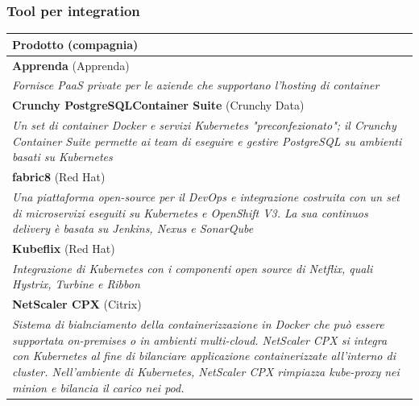 \documentclass[12pt, a4paper]{report}
\begin{document}
\subsubsection{Tool per integration}
\begin{table}[ht]
\small
\centering
\begin{tabularx}{\textwidth}{|l|}
\hline
\textbf{Prodotto} (compagnia) \\
\hline
\textbf{Apprenda} (Apprenda)\\
\multicolumn{1}{|X|}{\textit{Fornisce PaaS private per le aziende che supportano l'hosting di container}}\\
\hline
\textbf{Crunchy PostgreSQLContainer Suite} (Crunchy Data)\\
\multicolumn{1}{|X|}{\textit{Un set di container Docker e servizi Kubernetes "preconfezionato"; il Crunchy Container Suite permette ai team di eseguire e gestire PostgreSQL su ambienti basati su Kubernetes}}\\
\hline
\textbf{fabric8} (Red Hat)\\
\multicolumn{1}{|X|}{\textit{Una piattaforma open-source per il DevOps e integrazione costruita con un set di microservizi eseguiti su Kubernetes e OpenShift V3. La sua continuos delivery è basata su Jenkins, Nexus e SonarQube}}\\
\hline
\textbf{Kubeflix} (Red Hat)\\
\multicolumn{1}{|X|}{\textit{Integrazione di Kubernetes con i componenti open source di Netflix, quali Hystrix, Turbine e Ribbon}}\\
\hline
\textbf{NetScaler CPX} (Citrix)\\
\multicolumn{1}{|X|}{\textit{Sistema di bialnciamento della containerizzazione in Docker che può essere supportata on-premises o in ambienti multi-cloud. NetScaler CPX si integra con Kubernetes al fine di bilanciare applicazione containerizzate all'interno di cluster. Nell'ambiente di Kubernetes, NetScaler CPX rimpiazza kube-proxy nei minion e bilancia il carico nei pod. }}\\
\hline
\end{tabularx}
\end{table}
\end{document}
